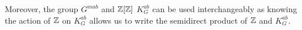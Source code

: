 Moreover, the group $G^{mab}$ and $\operatorname{\mathbb{Z}}[\operatorname{\mathbb{Z}}]$ $K_G^{ab}$ can be used interchangeably as knowing the action of $\operatorname{\mathbb{Z}}$ on $K_G^{ab}$ allows us to write the semidirect product of $\operatorname{\mathbb{Z}}$ and $K_G^{ab}$.

%





